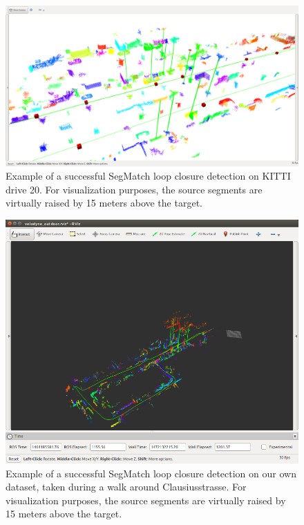 \begin{figure}
  \centering
  \includegraphics[width=5.2in]{images/segmatchae.png}
  \caption{Example of a successful SegMatch loop closure detection on KITTI drive 20. For visualization purposes, the source segments are virtually raised by 15 meters above the target.}
  \label{fig:segmatch-loop-closure}
\end{figure}

\begin{figure}
  \centering
  \includegraphics[width=5.2in]{images/clausius2.png}
  \caption{Example of a successful SegMatch loop closure detection on our own dataset, taken during a walk around Clausiusstrasse. For visualization purposes, the source segments are virtually raised by 15 meters above the target.}
  \label{fig:clausius2}
\end{figure}

